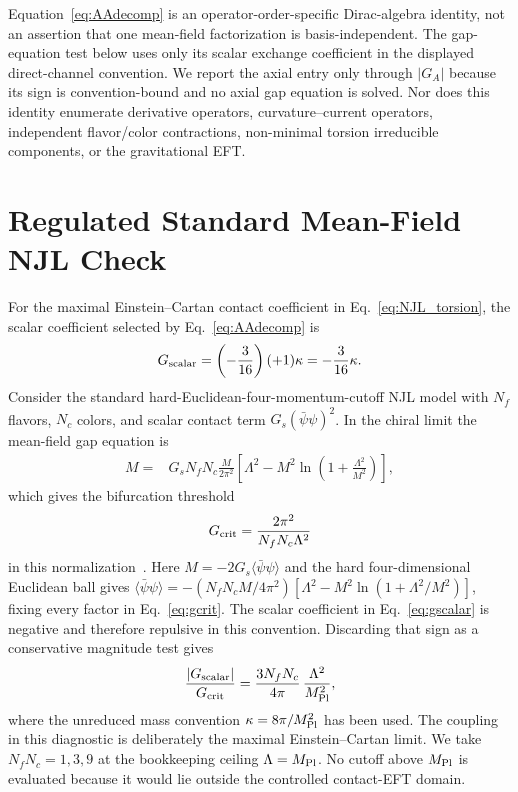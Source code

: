 \documentclass[aps,prd,twocolumn,superscriptaddress,preprintnumbers,nofootinbib,longbibliography,floatfix]{revtex4-2}
\begin{document}
Equation~\eqref{eq:AAdecomp} is an operator-order-specific Dirac-algebra
identity, not an assertion that one mean-field factorization is
basis-independent.  The gap-equation test below uses only its scalar exchange
coefficient in the displayed direct-channel convention.  We report the axial
entry only through $|G_A|$ because its sign is convention-bound and no axial
gap equation is solved.  Nor does this identity enumerate derivative
operators, curvature--current operators, independent flavor/color
contractions, non-minimal torsion irreducible components, or the gravitational
EFT.

\section{Regulated Standard Mean-Field NJL Check}\label{app:njl_gap}

For the maximal Einstein--Cartan contact coefficient in
Eq.~\eqref{eq:NJL_torsion}, the scalar coefficient selected by
Eq.~\eqref{eq:AAdecomp} is
\begin{equation}\label{eq:gscalar}
G_{\rm scalar}=\left(-\frac{3}{16}\right)(+1)\kappa
=-\frac{3}{16}\kappa.
\end{equation}
Consider the standard hard-Euclidean-four-momentum-cutoff NJL model with
$N_f$ flavors, $N_c$ colors, and scalar contact term
$G_s(\bar\psi\psi)^2$.  In the chiral limit the mean-field gap equation is
\begin{align}
M={}&G_sN_fN_c\frac{M}{2\pi^2}
\left[\Lambda^2-M^2\ln\!\left(1+\frac{\Lambda^2}{M^2}\right)\right],
\end{align}
which gives the bifurcation threshold
\begin{equation}\label{eq:gcrit}
G_{\rm crit}=\frac{2\pi^2}{N_fN_c\Lambda^2}
\end{equation}
in this normalization~\cite{Klevansky1992,HatsudaKunihiro1994,Buballa2005}.
Here $M=-2G_s\langle\bar\psi\psi\rangle$ and the hard four-dimensional
Euclidean ball gives
$\langle\bar\psi\psi\rangle=-(N_fN_cM/4\pi^2)
[\Lambda^2-M^2\ln(1+\Lambda^2/M^2)]$, fixing every factor in
Eq.~\eqref{eq:gcrit}.
The scalar coefficient in Eq.~\eqref{eq:gscalar} is negative and therefore
repulsive in this convention.  Discarding that sign as a conservative
magnitude test gives
\begin{equation}\label{eq:ratio}
\frac{|G_{\rm scalar}|}{G_{\rm crit}}
=\frac{3N_fN_c}{4\pi}\,\frac{\Lambda^2}{M_{\rm Pl}^2},
\end{equation}
where the unreduced mass convention $\kappa=8\pi/M_{\rm Pl}^2$ has been used.
The coupling in this diagnostic is deliberately the maximal
Einstein--Cartan limit.  We take $N_fN_c=1,3,9$ at the bookkeeping ceiling
$\Lambda=M_{\rm Pl}$.  No cutoff above $M_{\rm Pl}$ is evaluated because it
would lie outside the controlled contact-EFT domain.
\end{document}
